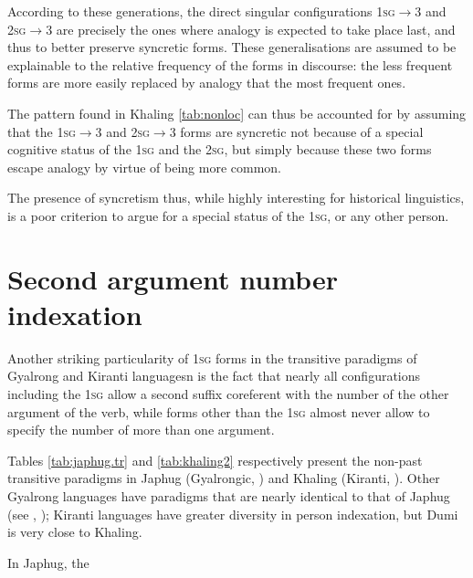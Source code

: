\documentclass{article}
\begin{document}
According to these generations, the  direct singular configurations \textsc{1sg$\rightarrow$3} and \textsc{2sg$\rightarrow$3} are precisely the ones where analogy is expected to take place last, and thus to better preserve syncretic forms. These generalisations are assumed to be explainable to the relative frequency of the forms in discourse: the less frequent forms are more easily replaced by analogy that the most frequent ones.

The pattern found in Khaling \ref{tab:nonloc} can thus be accounted for by assuming that the \textsc{1sg$\rightarrow$3} and \textsc{2sg$\rightarrow$3} forms are syncretic not because of a special cognitive status of the \textsc{1sg} and the \textsc{2sg}, but simply because these two forms escape analogy by virtue of being more common. 

The presence of syncretism thus, while highly interesting for historical linguistics, is a poor criterion to argue for a special status of the \textsc{1sg}, or any other person.

\section{Second argument number indexation}
Another striking particularity of \textsc{1sg} forms in the transitive paradigms of Gyalrong and Kiranti languagesn is the fact that nearly all configurations including the \textsc{1sg}  allow a second suffix coreferent with the number of the other argument of the verb, while forms other than the \textsc{1sg} 
almost never allow to specify the number of more than one argument.

Tables \ref{tab:japhug.tr} and \ref{tab:khaling2} respectively present the non-past transitive paradigms  in Japhug (Gyalrongic, \citealt{jacques10inverse}) and Khaling (Kiranti, \citealt[1102]{jacques12khaling}). Other Gyalrong languages have paradigms that are nearly identical to that of Japhug (see \citealt{gongxun14agreement}, \citealt{zhang16bragdbar}); Kiranti languages have greater diversity in person indexation, but Dumi is very close to Khaling.

In Japhug, the
\end{document}
